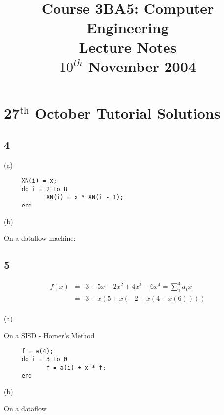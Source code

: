 \documentclass[a4paper,12pt]{article}
\begin{document}
\title{Course 3BA5: Computer Engineering \\ Lecture Notes \\ $10^{th}$ November 2004}

\maketitle

\section*{27$^{\mbox{th}}$ October Tutorial Solutions}

\subsection*{4}

(a)

\begin{verbatim}
     XN(i) = x;
     do i = 2 to 8
            XN(i) = x * XN(i - 1);
     end
\end{verbatim}

(b)

On a dataflow machine:

\begin{table}[hbtp]


\end{table}

\begin{table}[hbtp]


\end{table}

\begin{table}[hbtp]


\end{table}

\subsection*{5}

\begin{eqnarray*}
f(x)	&	=	&	3 + 5x - 2x^{2} + 4x^{3} - 6x^{4} = \sum^{4}_{1} a_{i} x	\\
		&	=	&	3 + x \left(5 + x \left(-2 + x \left(4 + x \left(6\right) \right) \right) \right)	\\ 
\end{eqnarray*}

(a)

On a SISD - Horner's Method

\begin{verbatim}
     f = a(4);
     do i = 3 to 0
            f = a(i) + x * f;
     end
\end{verbatim}

(b)

On a dataflow

\begin{table}[hbtp]


\end{table}
\end{document}
